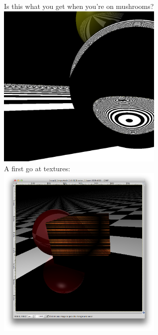 \documentclass[a4paper,11pt]{article}
\begin{document}
\newpage Is this what you get when you're on mushrooms?\\
\includegraphics[keepaspectratio,width=8.0cm]{images/tY3lkjt}\\

A first go at textures:\\
\includegraphics[keepaspectratio,width=8.0cm]{images/texture}\\
\end{document}
